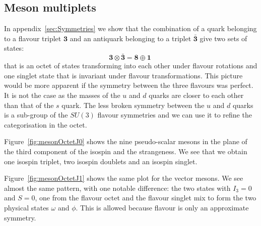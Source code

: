 \documentclass[12pt]{article}
\begin{document}
\subsection{Meson multiplets}
In appendix~\ref{sec:Symmetries} we show that the combination of a quark belonging to a flavour triplet $\mathbf{3}$ and an antiquark belonging to a triplet $\mathbf{\bar 3}$ give two sets of states:
\[\mathbf{3}\otimes \mathbf{\bar 3} = \mathbf{8}\oplus \mathbf{1}\;\] 
that is an octet of states transforming into each other under flavour rotations and one singlet state that is invariant under flavour transformations. This picture would be more apparent if the symmetry between the three flavours was perfect. It is not the case as the masses of the $u$  and $d$ quarks are closer to each other than that of the $s$ quark. The less broken symmetry between the $u$ and $d$ quarks is a sub-group of the $SU(3)$ flavour symmetries and we can use it to refine the categorisation in the octet. 

Figure~\ref{fig:mesonOctetJ0} shows the nine pseudo-scalar mesons in the plane of the third component of the isospin and the strangeness. We see that we obtain one isospin triplet, two isospin doublets and an isospin singlet.

Figure~\ref{fig:mesonOctetJ1} shows the same plot for the vector mesons. We see almost the same pattern, with one notable difference: the two states with $I_3=0$ and $S=0$, one from the flavour octet and the flavour singlet mix to form the two physical states $\omega$ and $\phi$. This is allowed because flavour is only an approximate symmetry. 
\end{document}
